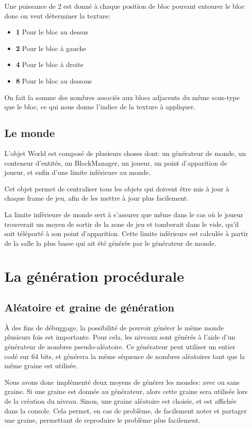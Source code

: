 \documentclass[10pt]{report}
\begin{document}
Une puissance de 2 est donné à chaque position de bloc pouvant entourer le bloc donc on veut déterminer la texture:
\begin{itemize}
  \item \textbf{1} Pour le bloc au dessus
  \item \textbf{2} Pour le bloc à gauche
  \item \textbf{4} Pour le bloc à droite
  \item \textbf{8} Pour le bloc au dessous
\end{itemize}
On fait la somme des nombres associés aux blocs adjacents du même sous-type que le bloc, ce qui nous donne l'indice de la texture à appliquer.

\subsection{Le monde}

L'objet World est composé de plusieurs choses dont: un générateur de monde, un conteneur d'entités,
un BlockManager, un joueur, un point d'apparition de joueur, et enfin d'une limite inférieure au monde.

Cet objet permet de centraliser tous les objets qui doivent être mis à jour à chaque frame de jeu, afin de
les mettre à jour plus facilement.

La limite inférieure de monde sert à s'assurer que même dans le cas où le joueur trouverait un moyen de sortir de la
zone de jeu et tomberait dans le vide, qu'il soit téléporté à son point d'apparition.
Cette limite inférieure est calculée à partir de la salle la plus basse qui ait été générée par le générateur de monde.

\section{La génération procédurale}
\subsection{Aléatoire et graine de génération}

À des fins de débuggage, la possibilité de pouvoir générer le même monde plusieurs fois est importante.
Pour cela, les niveaux sont générés à l'aide d'un générateur de nombres pseudo-aléatoire.
Ce générateur peut utiliser un entier codé sur 64 bits, et générera la même séquence de nombres
aléatoires tant que la même graine est utilisée. 

Nous avons donc implémenté deux moyens de générer les mondes: avec ou sans graine.
Si une graine est donnée au générateur, alors cette graine sera utilisée lors de la création du niveau.
Sinon, une graine aléatoire est choisie, et est affichée dans la console.
Cela permet, en cas de problème, de facilement noter et partager une graine, permettant de reproduire
le problème plus facilement.
\end{document}
